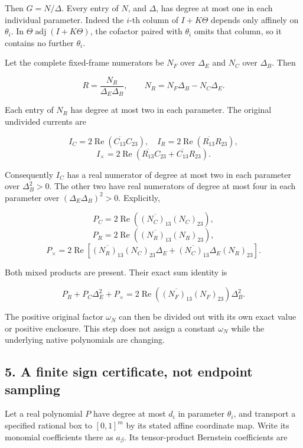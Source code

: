 Then \(G=N/\Delta\). Every entry of \(N\), and \(\Delta\), has degree at
most one in each individual parameter. Indeed the \(i\)-th column of
\(I+K\Theta\) depends only affinely on \(\theta_i\). In
\(\Theta\operatorname{adj}(I+K\Theta)\), the cofactor paired with
\(\theta_i\) omits that column, so it contains no further \(\theta_i\).

Let the complete fixed-frame numerators be \(N_F\) over \(\Delta_E\) and
\(N_C\) over \(\Delta_B\). Then

\[
 R=\frac{N_R}{\Delta_E\Delta_B},\qquad
 N_R=N_F\Delta_B-N_C\Delta_E.
\]

Each entry of \(N_R\) has degree at most two in each parameter. The
original undivided currents are

\[
 I_C=2\operatorname{Re}(\overline{C_{13}}C_{23}),
 \quad I_R=2\operatorname{Re}(\overline{R_{13}}R_{23}),
\] \[
 I_\times=2\operatorname{Re}
 (\overline{R_{13}}C_{23}+\overline{C_{13}}R_{23}).
\]

Consequently \(I_C\) has a real numerator of degree at most two in each
parameter over \(\Delta_B^2>0\). The other two have real numerators of
degree at most four in each parameter over \((\Delta_E\Delta_B)^2>0\).
Explicitly,

\[
 P_C=2\operatorname{Re}(\overline{(N_C)_{13}}(N_C)_{23}),
\] \[
 P_R=2\operatorname{Re}(\overline{(N_R)_{13}}(N_R)_{23}),
\] \[
 P_\times=2\operatorname{Re}
 [\overline{(N_R)_{13}}(N_C)_{23}\Delta_E
 +\overline{(N_C)_{13}}\Delta_E(N_R)_{23}].
\]

Both mixed products are present. Their exact sum identity is

\[
 P_R+P_C\Delta_E^2+P_\times
 =2\operatorname{Re}(\overline{(N_F)_{13}}(N_F)_{23})\Delta_B^2.
\]

The positive original factor \(\omega_N\) can then be divided out with
its own exact value or positive enclosure. This step does not assign a
constant \(\omega_N\) while the underlying native polynomials are
changing.

\subsection{5. A finite sign certificate, not endpoint
sampling}\label{a-finite-sign-certificate-not-endpoint-sampling}

Let a real polynomial \(P\) have degree at most \(d_i\) in parameter
\(\theta_i\), and transport a specified rational box to \([0,1]^m\) by
its stated affine coordinate map. Write its monomial coefficients there
as \(a_\beta\). Its tensor-product Bernstein coefficients are

